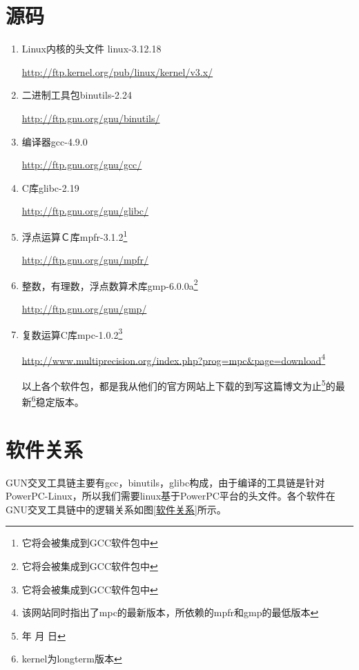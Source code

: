 \documentclass[12pt,a4paper]{article}
\renewcommand{\today}{\number\year 年 \number\month 月 \number\day 日}
\begin{document}
\section{源码} 
\begin{enumerate}
    \item Linux内核的头文件 linux-3.12.18

        \url{http://ftp.kernel.org/pub/linux/kernel/v3.x/}\href{http://ftp.kernel.org/pub/linux/kernel/v3.x/}{}
    \item 二进制工具包binutils-2.24

        \url{http://ftp.gnu.org/gnu/binutils/}\href{http://ftp.gnu.org/gnu/binutils/}{}
    \item 编译器gcc-4.9.0

        \url{http://ftp.gnu.org/gnu/gcc/}\href{http://ftp.gnu.org/gnu/gcc/}{}
    \item C库glibc-2.19

        \url{http://ftp.gnu.org/gnu/glibc/}\href{http://ftp.gnu.org/gnu/glibc/}{}
    \item 浮点运算Ｃ库mpfr-3.1.2\footnote{它将会被集成到GCC软件包中}

        \url{http://ftp.gnu.org/gnu/mpfr/}\href{http://ftp.gnu.org/gnu/mpfr/}{}
    \item 整数，有理数，浮点数算术库gmp-6.0.0a\footnote{它将会被集成到GCC软件包中}

        \url{http://ftp.gnu.org/gnu/gmp/}\href{http://ftp.gnu.org/gnu/gmp/}{}
    \item 复数运算C库mpc-1.0.2\footnote{它将会被集成到GCC软件包中}

        \url{http://www.multiprecision.org/index.php?prog=mpc&page=download}\href{http://www.multiprecision.org/index.php?prog=mpc&page=download}{}\footnote{该网站同时指出了mpc的最新版本，所依赖的mpfr和gmp的最低版本}

        以上各个软件包，都是我从他们的官方网站上下载的到写这篇博文为止\footnote{\today}的最新\footnote{kernel为longterm版本}稳定版本。 

\end{enumerate}

\section{软件关系} 
GUN交叉工具链主要有gcc，binutils，glibc构成，由于编译的工具链是针对PowerPC-Linux，所以我们需要linux基于PowerPC平台的头文件。各个软件在GNU交叉工具链中的逻辑关系如图\ref{软件关系}所示。
\end{document}
